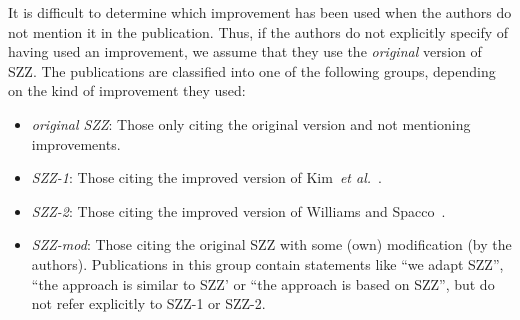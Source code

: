 \documentclass[a4paper, 12pt]{book}
\begin{document}
It is difficult to determine which improvement has been used when the authors do not mention it in the publication. Thus, if the authors do not explicitly specify of having used an improvement, we assume that they use the \emph{original} version of SZZ. The publications are classified into one of the following groups, depending on the kind of improvement they used:

\begin{itemize}
	\item \emph{original SZZ}: Those only citing the original version and not mentioning improvements. 
	\item \emph{SZZ-1}: Those citing the improved version of Kim~\textit{et al.}~\cite{kim2006automatic}. 
	\item \emph{SZZ-2}: Those citing the improved version of Williams and Spacco~\cite{williams2008szz}.
	\item \emph{SZZ-mod}: Those citing the original SZZ with some (own) modification (by the authors). Publications in this group contain statements like ``we adapt SZZ'', ``the approach is similar to SZZ' or ``the approach is based on SZZ'', but do not refer explicitly to SZZ-1 or SZZ-2.
\end{itemize}
\end{document}

